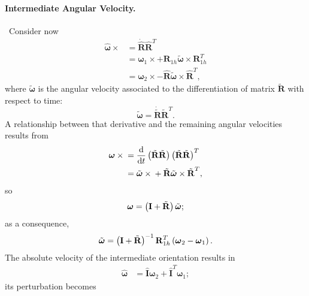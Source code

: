 \documentclass[10pt,dvips,fleqn,subeqn]{report}
\newcommand{\T}[1]{\bm{\mathbf{#1}}}
\newcommand{\TT}[1]{\bm{\mathbf{#1}}}
\begin{document}
\paragraph{Intermediate Angular Velocity.} \
Consider now
\begin{align}
	\hat{\T{\omega}}\times{}
	&= \dot{\hat{\T{R}}} \hat{\T{R}}^T \nonumber \\
	&= \T{\omega}_{1} \times
		+ \T{R}_{1h} \tilde{\T{\omega}}\times \T{R}_{1h}^T \nonumber \\
	&= \T{\omega}_{2} \times
		- \hat{\T{R}} \tilde{\T{\omega}}\times \hat{\T{R}}^T ,
\end{align}
where $\tilde{\T{\omega}}$ is the angular velocity associated
to the differentiation of matrix $\tilde{\T{R}}$ with respect to time:
\begin{equation}
	\tilde{\T{\omega}}
	= \dot{\tilde{\T{R}}} \tilde{\T{R}}^T .
\end{equation}
A relationship between that derivative and the remaining angular velocities
results from
\begin{align}
	\T{\omega} \times{}
	&= \frac{\mathrm{d}}{\mathrm{d}t}\plbr{
		\tilde{\T{R}} \tilde{\T{R}}
	} \plbr{
		\tilde{\T{R}} \tilde{\T{R}}
	}^T \nonumber \\
	&= \tilde{\T{\omega}} \times{}
	+ \tilde{\T{R}} \tilde{\T{\omega}} \times \tilde{\T{R}}^T ,
\end{align}
so
\begin{equation}
	\T{\omega} = \plbr{\T{I} + \tilde{\T{R}}} \tilde{\T{\omega}} ;
\end{equation}
as a consequence,
\begin{equation}
	\tilde{\T{\omega}}
	= \plbr{\T{I} + \tilde{\T{R}}}^{-1} \T{R}_{1h}^T \plbr{
		\T{\omega}_2 - \T{\omega}_1
	} .
\end{equation}
The absolute velocity of the intermediate orientation results in
\begin{align}
	\hat{\T{\omega}}
	&= \hat{\TT{I}} \T{\omega}_2
	+ \hat{\TT{I}}^T \T{\omega}_1 ;
	\label{eq:deformable-displacement-invariant-hat-omega}
\end{align}
its perturbation becomes
\end{document}
